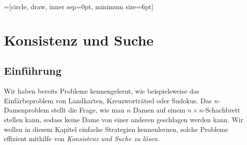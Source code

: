 \newcommand{\domain}{\operatorname{domain}}
\newtheorem{beispiel}{Beispiel}
\usetikzlibrary{decorations.markings}
=[circle, draw, inner sep=0pt, minimum size=6pt]
\newcommand{\vertex}{\node[vertex]}



\chapter{Konsistenz und Suche}

\section{Einführung}\label{sec:einfuehrung}
	Wir haben bereits Probleme kennengelernt, wie beispielsweise das Einfärbeproblem von Landkarten, Kreuzworträtsel oder Sudokus. Das $n$-Damenproblem stellt die Frage, wie man $n$ Damen auf einem $n\times n$-Schachbrett stellen kann, sodass keine Dame von einer anderen geschlagen werden kann. Wir wollen in diesem Kapitel einfache Strategien kennenlernen, solche Probleme effizient mithilfe von \em Konsistenz und Suche \em zu lösen.
